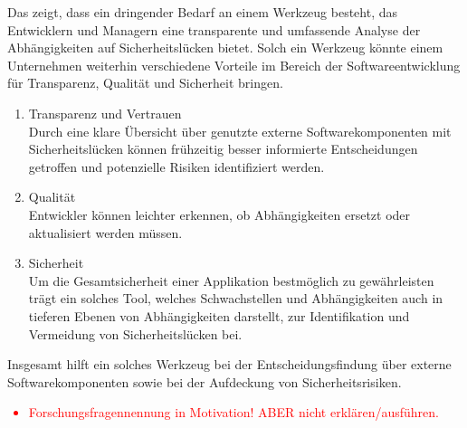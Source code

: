     Das zeigt, dass ein dringender Bedarf an einem Werkzeug besteht, das Entwicklern und Managern eine transparente und umfassende Analyse der Abhängigkeiten auf Sicherheitslücken bietet.
    Solch ein Werkzeug könnte einem Unternehmen weiterhin verschiedene Vorteile im Bereich der Softwareentwicklung für Transparenz, Qualität und Sicherheit bringen.
    \begin{enumerate}
        \item Transparenz und Vertrauen\\
            Durch eine klare Übersicht über genutzte externe Softwarekomponenten mit Sicherheitslücken können frühzeitig besser informierte Entscheidungen getroffen und potenzielle Risiken identifiziert werden.
        \item Qualität\\
            Entwickler können leichter erkennen, ob Abhängigkeiten ersetzt oder aktualisiert werden müssen.
        \item Sicherheit\\
            Um die Gesamtsicherheit einer Applikation bestmöglich zu gewährleisten trägt ein solches Tool, welches Schwachstellen und Abhängigkeiten auch in tieferen Ebenen von Abhängigkeiten darstellt, zur Identifikation und Vermeidung von Sicherheitslücken bei. 
    \end{enumerate}
    Insgesamt hilft ein solches Werkzeug bei der Entscheidungsfindung über externe Softwarekomponenten sowie bei der Aufdeckung von Sicherheitsrisiken.

    \textcolor{red}{
        \begin{itemize}
            \item Forschungsfragennennung in Motivation! ABER nicht erklären/ausführen.
        \end{itemize}
    }
